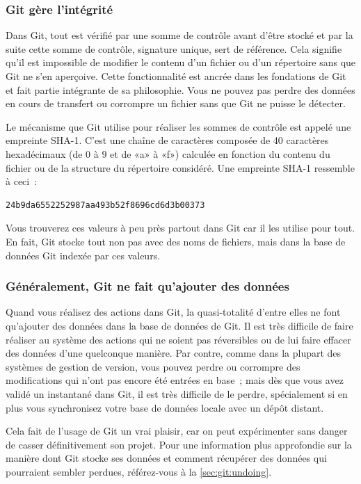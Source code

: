 \subsubsection{Git gère l'intégrité}

Dans Git, tout est vérifié par une somme de contrôle avant d'être stocké et par la suite cette somme de contrôle, signature unique, sert de référence.
Cela signifie qu'il est impossible de modifier le contenu d'un fichier ou d'un répertoire sans que Git ne s'en aperçoive.
Cette fonctionnalité est ancrée dans les fondations de Git et fait partie intégrante de sa philosophie.
Vous ne pouvez pas perdre des données en cours de transfert ou corrompre un fichier sans que Git ne puisse le détecter.

Le mécanisme que Git utilise pour réaliser les sommes de contrôle est appelé une empreinte SHA-1.
C'est une chaîne de caractères composée de 40 caractères hexadécimaux (de $0$ à $9$ et de «a» à «f») calculée en fonction du contenu du fichier ou de la structure du répertoire considéré.
Une empreinte SHA-1 ressemble à ceci :
\begin{Schunk}
\begin{Verbatim}
24b9da6552252987aa493b52f8696cd6d3b00373
\end{Verbatim}
\end{Schunk}

Vous trouverez ces valeurs à peu près partout dans Git car il les utilise pour tout.
En fait, Git stocke tout non pas avec des noms de fichiers, mais dans la base de données Git indexée par ces valeurs.

\subsubsection{Généralement, Git ne fait qu'ajouter des données}

Quand vous réalisez des actions dans Git, la quasi-totalité d'entre elles ne font qu'ajouter des données dans la base de données de Git.
Il est très difficile de faire réaliser au système des actions qui ne soient pas réversibles ou de lui faire effacer des données d'une quelconque manière.
Par contre, comme dans la plupart des systèmes de gestion de version, vous pouvez perdre ou corrompre des modifications qui n'ont pas encore été entrées en base ;
mais dès que vous avez validé un instantané dans Git, il est très difficile de le perdre, spécialement si en plus vous synchronisez votre base de données locale avec un dépôt distant.

Cela fait de l'usage de Git un vrai plaisir, car on peut expérimenter sans danger de casser définitivement son projet.
Pour une information plus approfondie sur la manière dont Git stocke ses données et comment récupérer des données qui pourraient sembler perdues, référez-vous à la \autoref{sec:git:undoing}.

